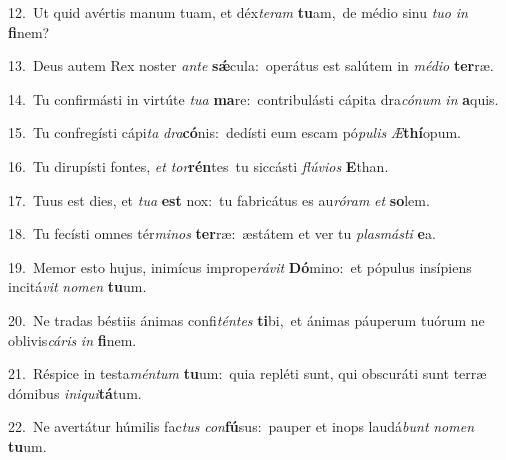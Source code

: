 {\numbfont\textcolor{\numbcolor}{12.}}~Ut quid avértis manum tuam, et déx\-\textit{te}\-\textit{ram} \textbf{tu}\-am,~\star de médio sinu \textit{tu}\-\textit{o} \textit{in} \textbf{fi}\-nem?\par
{\numbfont\textcolor{\numbcolor}{13.}}~Deus autem Rex noster \textit{an}\-\textit{te} \textbf{sǽ}\-cula:~\star operátus est salútem in \textit{mé}\-\textit{di}\textit{o} \textbf{ter}\-ræ.\par
{\numbfont\textcolor{\numbcolor}{14.}}~Tu confirmásti in virtúte \textit{tu}\-\textit{a} \textbf{ma}\-re:~\star contribulásti cápita dra\-\textit{có}\-\textit{num} \textit{in} \textbf{a}\-quis.\par
{\numbfont\textcolor{\numbcolor}{15.}}~Tu confregísti cápi\textit{ta} \textit{dra}\-\textbf{có}nis:~\star dedísti eum escam pó\-\textit{pu}\-\textit{lis} \textit{Æ}\-\textbf{thí}opum.\par
{\numbfont\textcolor{\numbcolor}{16.}}~Tu dirupísti fontes, \textit{et} \textit{tor}\-\textbf{rén}tes~\star tu siccásti \textit{flú}\-\textit{vi}\textit{os} \textbf{E}\-than.\par
{\numbfont\textcolor{\numbcolor}{17.}}~Tuus est dies, et \textit{tu}\-\textit{a} \textbf{est} nox:~\star tu fabricátus es au\-\textit{ró}\-\textit{ram} \textit{et} \textbf{so}\-lem.\par
{\numbfont\textcolor{\numbcolor}{18.}}~Tu fecísti omnes tér\-\textit{mi}\-\textit{nos} \textbf{ter}\-ræ:~\star æstátem et ver tu \textit{plas}\-\textit{más}\textit{ti} \textbf{e}\-a.\par
{\numbfont\textcolor{\numbcolor}{19.}}~Memor esto hujus, inimícus imprope\-\textit{rá}\-\textit{vit} \textbf{Dó}\-mino:~\star et pópulus insípiens incitá\textit{vit} \textit{no}\-\textit{men} \textbf{tu}\-um.\par
{\numbfont\textcolor{\numbcolor}{20.}}~Ne tradas béstiis ánimas confi\-\textit{tén}\-\textit{tes} \textbf{ti}\-bi,~\star et ánimas páuperum tuórum ne oblivis\-\textit{cá}\-\textit{ris} \textit{in} \textbf{fi}\-nem.\par
{\numbfont\textcolor{\numbcolor}{21.}}~Réspice in testa\-\textit{mén}\-\textit{tum} \textbf{tu}\-um:~\star quia repléti sunt, qui obscuráti sunt terræ dómibus \textit{in}\-\textit{i}\textit{qui}\textbf{tá}tum.\par
{\numbfont\textcolor{\numbcolor}{22.}}~Ne avertátur húmilis fac\textit{tus} \textit{con}\-\textbf{fú}sus:~\star pauper et inops laudá\textit{bunt} \textit{no}\-\textit{men} \textbf{tu}\-um.\par

